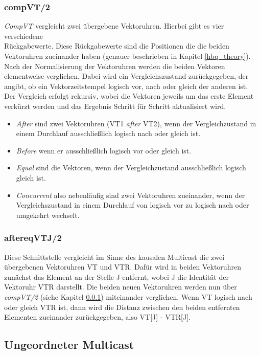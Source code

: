 \subsubsection{compVT/2} \label{vectorC_comp}

\textit{CompVT} vergleicht zwei übergebene Vektoruhren. Hierbei gibt es vier verschiedene\\ Rückgabewerte. Diese Rückgabewerte sind die Positionen die die beiden Vektoruhren zueinander haben (genauer beschrieben in Kapitel \ref{hbq_theory}).\\
Nach der Normalisierung der Vektoruhren werden die beiden Vektoren elementweise verglichen. Dabei wird ein Vergleichszustand zurückgegeben, der angibt, ob ein Vektorzeitstempel logisch vor, nach oder gleich der anderen ist. Der Vergleich erfolgt rekursiv, wobei die Vektoren jeweils um das erste Element verkürzt werden und das Ergebnis Schritt für Schritt aktualisiert wird.
\begin{itemize}
    \item \textit{After} sind zwei Vektoruhren (VT1 \textit{after} VT2), wenn der Vergleichzustand in einem Durchlauf ausschließlich logisch nach oder gleich ist.
    \item \textit{Before} wenn er ausschließlich logisch vor oder gleich ist.
    \item \textit{Equal} sind die Vektoren, wenn der Vergleichzustand ausschließlich logisch gleich ist.
    \item \textit{Concurrent} also nebenläufig sind zwei Vektoruhren zueinander, wenn der Vergleichszustand in einem Durchlauf von logisch vor zu logisch nach oder umgekehrt wechselt.
\end{itemize}

\subsubsection{aftereqVTJ/2} \label{aftereqvtj_entwurf}

Diese Schnittstelle vergleicht im Sinne des kausalen Multicast die zwei übergebenen Vektoruhren VT und VTR.
Dafür wird in beiden Vektoruhren zunächst das Element an der Stelle J entfernt, wobei J die Identität der Vektoruhr VTR darstellt.
Die beiden neuen Vektoruhren werden nun über \textit{compVT/2} (siehe Kapitel \ref{vectorC_comp}) miteinander verglichen. Wenn VT logisch nach oder gleich VTR ist, dann wird die Distanz zwischen den beiden entfernten Elementen zueinander zurückgegeben, also VT[J] - VTR[J].

\subsection{Ungeordneter Multicast}

